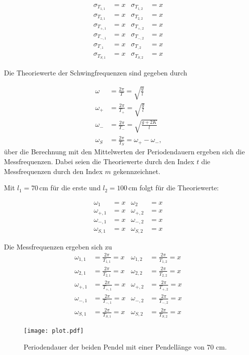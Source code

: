 
\begin{align}
  σ_{T_{1,1}} & = x & σ_{T_{1,2}} & = x \\
  σ_{T_{2,1}} & = x & σ_{T_{2,2}} & = x \\
  σ_{T_{+,1}} & = x & σ_{T_{+,2}} & = x \\
  σ_{T_{-,1}} & = x & σ_{T_{-,2}} & = x \\
  σ_{T_{,1}} & = x & σ_{T_{,2}} & = x \\
  σ_{T_{S,1}} & = x & σ_{T_{S,2}} & = x 
\end{align}

Die Theoriewerte der Schwingfrequenzen sind gegeben durch

\begin{align}
  \omega   & = \frac{2π}{T}     =   \sqrt{\frac{g}{l}} \\
  \omega_+ & = \frac{2π}{T_+} =   \sqrt{\frac{g}{l}} \\
  \omega_- & = \frac{2π}{T_-} =\sqrt{\frac{g+2K}{l}} \\
  \omega_S & = \frac{2π}{T_S} =  \omega_+ -\omega_- \text{,}
\end{align}
über die Berechnung mit den Mittelwerten der Periodendauern ergeben sich die Messfrequenzen. Dabei seien die Theoriewerte durch den Index $t$
die Messfrequenzen durch den Index $m$ gekennzeichnet.

Mit $l_1=70 \, \unit{\centi\meter}$ für die erste und $l_2= 100 \, \unit{\centi\meter}$ folgt für die Theoriewerte:

\begin{align}
\omega_1 & = x & \omega_2 & = x \\
\omega_{+,1} & = x & \omega_{+,2} & = x \\
\omega_{-,1} & = x & \omega_{-,2} & = x \\
\omega_{S,1} & = x & \omega_{S,2} & = x 
\end{align}

Die Messfrequenzen ergeben sich zu
\begin{align}
\omega_{1,1} & = \frac{2π}{T_{1,1}}   = x & \omega_{1,2} & =  \frac{2π}{T_{1,2}}   = x \\
\omega_{2,1} & = \frac{2π}{T_{2,1}}  = x & \omega_{2,2} & =  \frac{2π}{T_{2,2}}  = x \\
\omega_{+,1} & = \frac{2π}{T_{+,1}}  = x & \omega_{+,2} & =  \frac{2π}{T_{+,2}}  = x \\
\omega_{-,1} & = \frac{2π}{T_{-,1}}  = x & \omega_{-,2} & =  \frac{2π}{T_{-,2}}  = x \\
\omega_{S,1} & = \frac{2π}{T_{S,1}} = x & \omega_{S,2} & =   \frac{2π}{T_{S,2}}     = x
\end{align} 



\begin{figure}
  \centering
  \texttt{[image: plot.pdf]}
  \caption{Periodendauer der beiden Pendel mit einer Pendellänge von 70 cm.}
  \label{fig:plot}
\end{figure}


